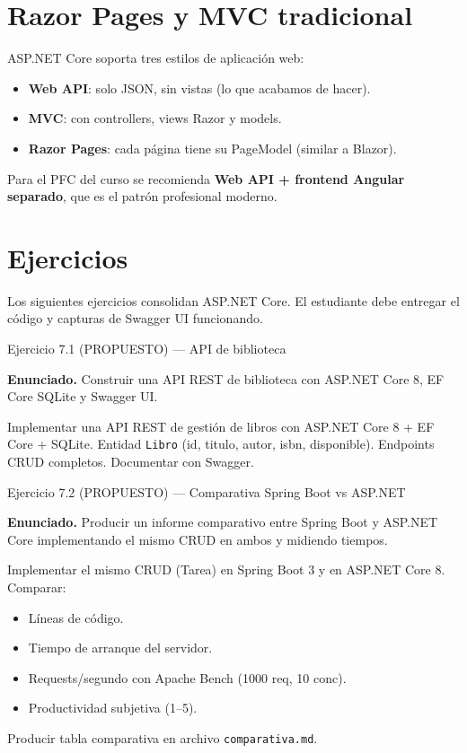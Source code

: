 \documentclass[11pt,a4paper,openany]{book}
\begin{document}
\section{Razor Pages y MVC tradicional}

ASP.NET Core soporta tres estilos de aplicación web:
\begin{itemize}
\item \textbf{Web API}: solo JSON, sin vistas (lo que acabamos de
hacer).
\item \textbf{MVC}: con controllers, views Razor y models.
\item \textbf{Razor Pages}: cada página tiene su PageModel
(similar a Blazor).
\end{itemize}

Para el PFC del curso se recomienda \textbf{Web API + frontend
Angular separado}, que es el patrón profesional moderno.

\section{Ejercicios}

Los siguientes ejercicios consolidan ASP.NET Core. El
estudiante debe entregar el código y capturas de Swagger UI
funcionando.


\begin{cajaejercicio}{Ejercicio 7.1 (PROPUESTO) --- API de biblioteca}


\textbf{Enunciado.} Construir una API REST de biblioteca con ASP.NET Core 8, EF Core SQLite y Swagger UI.

Implementar una API REST de gestión de libros con ASP.NET Core 8 +
EF Core + SQLite. Entidad \texttt{Libro} (id, titulo, autor, isbn,
disponible). Endpoints CRUD completos. Documentar con Swagger.
\end{cajaejercicio}

\begin{cajaejercicio}{Ejercicio 7.2 (PROPUESTO) --- Comparativa Spring Boot vs ASP.NET}


\textbf{Enunciado.} Producir un informe comparativo entre Spring Boot y ASP.NET Core implementando el mismo CRUD en ambos y midiendo tiempos.

Implementar el mismo CRUD (Tarea) en Spring Boot 3 y en ASP.NET Core
8. Comparar:
\begin{itemize}
\item Líneas de código.
\item Tiempo de arranque del servidor.
\item Requests/segundo con Apache Bench (1000 req, 10 conc).
\item Productividad subjetiva (1--5).
\end{itemize}
Producir tabla comparativa en archivo \texttt{comparativa.md}.
\end{cajaejercicio}
\end{document}
